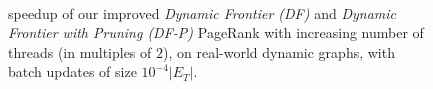 \begin{figure}[!hbt]
  \centering
   \\[-2ex]
  \caption{ speedup of our improved \textit{Dynamic Frontier (DF)} and \textit{Dynamic Frontier with Pruning (DF-P)} PageRank with increasing number of threads (in multiples of $2$), on real-world dynamic graphs, with batch updates of size $10^{-4}|E_T|$.}
  \label{fig:strong-scaling}
\end{figure}
